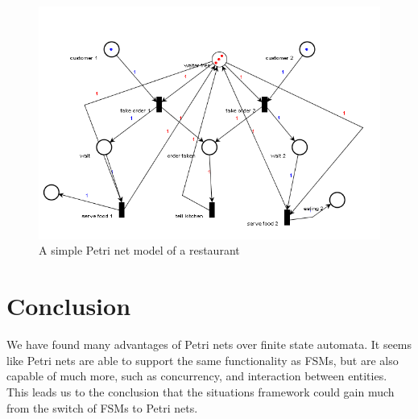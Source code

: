\documentclass[11pt]{article}
\begin{document}
\begin{figure}
\caption{A simple Petri net model of a restaurant}
\begin{center}
\includegraphics{restaurant}
\end{center}
\label{restaurantnet}
\end{figure}

\section{Conclusion}
We have found many advantages of Petri nets over finite state automata. It seems like Petri nets are able to support the same functionality as FSMs, but are also capable of much more, such as concurrency, and interaction between entities. This leads us to the conclusion that the situations framework could gain much from the switch of FSMs to Petri nets.



\end{document}
